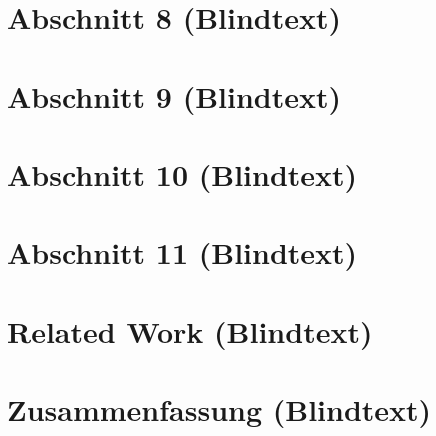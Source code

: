 \documentclass[ngerman]{ewks-latex}
\begin{document}
\section{Abschnitt 8 (Blindtext)}
\lipsum[5-10]

\section{Abschnitt 9 (Blindtext)}
\lipsum[11-20]

\section{Abschnitt 10 (Blindtext)}
\lipsum[21-30]

\section{Abschnitt 11 (Blindtext)}
\lipsum[31-32]

\section{Related Work (Blindtext)}
\lipsum[33-37]

\section{Zusammenfassung (Blindtext)}
\lipsum[42-44]


\newpage




\end{document}
